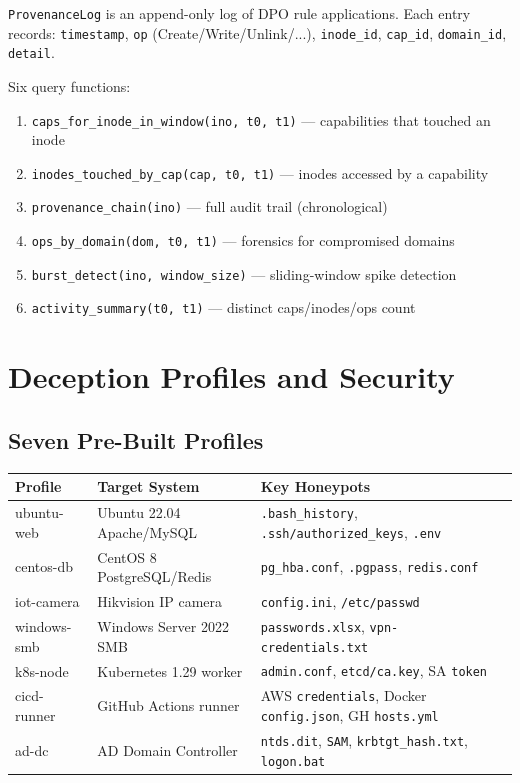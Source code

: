\documentclass[11pt,a4paper,twoside]{report}
\theoremstyle{definition}
\begin{document}
\texttt{ProvenanceLog} is an append-only log of DPO rule applications.
Each entry records: \texttt{timestamp}, \texttt{op} (Create/Write/Unlink/...),
\texttt{inode\_id}, \texttt{cap\_id}, \texttt{domain\_id}, \texttt{detail}.

Six query functions:
\begin{enumerate}
\item \texttt{caps\_for\_inode\_in\_window(ino, t0, t1)} --- capabilities that touched an inode
\item \texttt{inodes\_touched\_by\_cap(cap, t0, t1)} --- inodes accessed by a capability
\item \texttt{provenance\_chain(ino)} --- full audit trail (chronological)
\item \texttt{ops\_by\_domain(dom, t0, t1)} --- forensics for compromised domains
\item \texttt{burst\_detect(ino, window\_size)} --- sliding-window spike detection
\item \texttt{activity\_summary(t0, t1)} --- distinct caps/inodes/ops count
\end{enumerate}

\chapter{Deception Profiles and Security}

\section{Seven Pre-Built Profiles}

\begin{center}\small
\begin{tabular}{lp{3.5cm}p{5.5cm}}
\toprule
\textbf{Profile} & \textbf{Target System} & \textbf{Key Honeypots} \\
\midrule
ubuntu-web  & Ubuntu 22.04 Apache/MySQL & \texttt{.bash\_history}, \texttt{.ssh/authorized\_keys}, \texttt{.env} \\
centos-db   & CentOS 8 PostgreSQL/Redis & \texttt{pg\_hba.conf}, \texttt{.pgpass}, \texttt{redis.conf} \\
iot-camera  & Hikvision IP camera & \texttt{config.ini}, \texttt{/etc/passwd} \\
windows-smb & Windows Server 2022 SMB & \texttt{passwords.xlsx}, \texttt{vpn-credentials.txt} \\
k8s-node    & Kubernetes 1.29 worker & \texttt{admin.conf}, \texttt{etcd/ca.key}, SA \texttt{token} \\
cicd-runner & GitHub Actions runner & AWS \texttt{credentials}, Docker \texttt{config.json}, GH \texttt{hosts.yml} \\
ad-dc       & AD Domain Controller & \texttt{ntds.dit}, \texttt{SAM}, \texttt{krbtgt\_hash.txt}, \texttt{logon.bat} \\
\bottomrule
\end{tabular}
\end{center}
\end{document}
